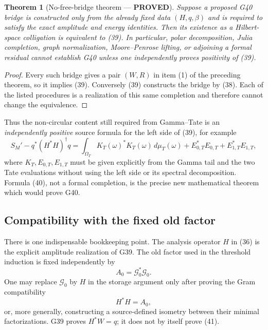 \documentclass[11pt]{article}
\newtheorem{theorem}{Theorem}
\newcommand{\PROVED}{\textcolor{green!45!black}{\textbf{PROVED}}}
\begin{document}
\begin{theorem}[No-free-bridge theorem --- \PROVED]
Suppose a proposed G40 bridge is constructed only from the already fixed data
$(H,q,\beta)$ and is required to satisfy the exact amplitude and energy
identities.  Then its existence as a Hilbert-space colligation is equivalent
to (39).  In particular, polar decomposition, Julia completion, graph
normalization, Moore--Penrose lifting, or adjoining a formal residual cannot
establish G40 unless one independently proves positivity of (39).
\end{theorem}

\begin{proof}
Every such bridge gives a pair $(W,R)$ in item (1) of the preceding theorem,
so it implies (39).  Conversely (39) constructs the bridge by (38).  Each of
the listed procedures is a realization of this same completion and therefore
cannot change the equivalence.
\end{proof}

Thus the non-circular content still required from Gamma--Tate is an
\emph{independently positive} source formula for the left side of (39), for
example
\begin{equation}
 S_M'-q^*(H^*H)^\dagger q
 =\int_{\Omega_T}K_T(\omega)^*K_T(\omega)\,d\mu_T(\omega)
  +E_{0,T}^*E_{0,T}+E_{1,T}^*E_{1,T},                  \tag{40}
\end{equation}
where $K_T,E_{0,T},E_{1,T}$ must be given explicitly from the Gamma tail and
the two Tate evaluations without using the left side or its spectral
decomposition.  Formula (40), not a formal completion, is the precise new
mathematical theorem which would prove G40.

\subsection{Compatibility with the fixed old factor}

There is one indispensable bookkeeping point.  The analysis operator $H$ in
(36) is the explicit amplitude realization of G39.  The old factor used in
the threshold induction is fixed independently by
\[
 A_0=\mathcal G_0^*\mathcal G_0.
\]
One may replace $\mathcal G_0$ by $H$ in the storage argument only after
proving the Gram compatibility
\begin{equation}
H^*H=A_0,                                               \tag{41}
\end{equation}
or, more generally, constructing a source-defined isometry between their
minimal factorizations.  G39 proves $H^*W=q$; it does not by itself prove
(41).
\end{document}
